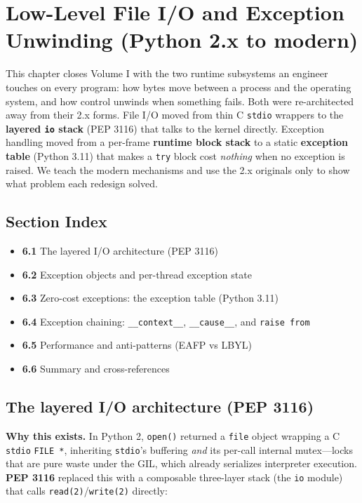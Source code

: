 \chapter{Low-Level File I/O and Exception Unwinding (Python 2.x to modern)}

This chapter closes Volume I with the two runtime subsystems an engineer touches on every
program: how bytes move between a process and the operating system, and how control unwinds when
something fails. Both were re-architected away from their 2.x forms. File I/O moved from thin C
\texttt{stdio} wrappers to the \textbf{layered \texttt{io} stack} (PEP 3116) that talks to the
kernel directly. Exception handling moved from a per-frame \textbf{runtime block stack} to a
static \textbf{exception table} (Python 3.11) that makes a \texttt{try} block cost \emph{nothing}
when no exception is raised. We teach the modern mechanisms and use the 2.x originals only to
show what problem each redesign solved.

\section*{Section Index}
\begin{itemize}
  \item \textbf{6.1} The layered I/O architecture (PEP 3116)
  \item \textbf{6.2} Exception objects and per-thread exception state
  \item \textbf{6.3} Zero-cost exceptions: the exception table (Python 3.11)
  \item \textbf{6.4} Exception chaining: \texttt{\_\_context\_\_}, \texttt{\_\_cause\_\_}, and \texttt{raise from}
  \item \textbf{6.5} Performance and anti-patterns (EAFP vs LBYL)
  \item \textbf{6.6} Summary and cross-references
\end{itemize}

\section{The layered I/O architecture (PEP 3116)}

\textbf{Why this exists.} In Python 2, \texttt{open()} returned a \texttt{file} object wrapping a
C \texttt{stdio} \texttt{FILE *}, inheriting \texttt{stdio}'s buffering \emph{and} its per-call
internal mutex---locks that are pure waste under the GIL, which already serializes interpreter
execution. \textbf{PEP 3116} replaced this with a composable three-layer stack (the \texttt{io}
module) that calls \texttt{read(2)}/\texttt{write(2)} directly:

